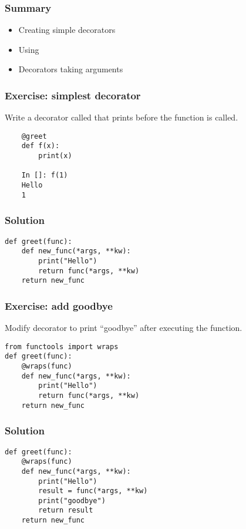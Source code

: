 \documentclass[14pt,compress,aspectratio=169]{beamer}
\begin{document}
\begin{frame}
  \frametitle{Summary}
  \begin{itemize}
  \item Creating simple decorators
  \item Using 
  \item Decorators taking arguments
  \end{itemize}
\end{frame}

\begin{frame}
  \frametitle{Exercise: simplest decorator}
  \begin{block}{}
    Write a decorator called  that prints  before
    the function is called.
  \end{block}
  \begin{lstlisting}
    @greet
    def f(x):
        print(x)

    In []: f(1)
    Hello
    1
\end{lstlisting}
\end{frame}


\begin{frame}
  \frametitle{Solution}
\begin{lstlisting}
def greet(func):
    def new_func(*args, **kw):
        print("Hello")
        return func(*args, **kw)
    return new_func
\end{lstlisting}
\end{frame}

\begin{frame}
  \frametitle{Exercise: add goodbye}
  \begin{block}{}
    Modify decorator  to print ``goodbye'' after executing the
    function.
  \end{block}
  \begin{lstlisting}
from functools import wraps
def greet(func):
    @wraps(func)
    def new_func(*args, **kw):
        print("Hello")
        return func(*args, **kw)
    return new_func
\end{lstlisting}

\end{frame}

\begin{frame}[fragile]
  \frametitle{Solution}
\begin{lstlisting}
def greet(func):
    @wraps(func)
    def new_func(*args, **kw):
        print("Hello")
        result = func(*args, **kw)
        print("goodbye")
        return result
    return new_func
\end{lstlisting}
\end{frame}
\end{document}
